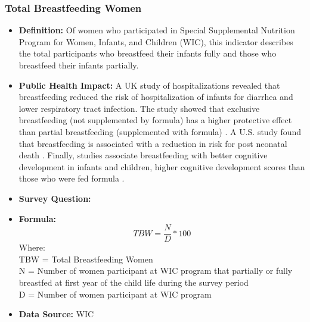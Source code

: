 \documentclass[12pt,letterpaper]{report}
\begin{document}
\subsubsection{Total Breastfeeding Women}
\begin{itemize}
		\item \textbf{Definition:} Of women who participated in Special Supplemental Nutrition Program for Women, Infants, and Children (WIC), this indicator describes the total participants who breastfeed their infants fully and those who breastfeed their infants partially. 
		\item \textbf{Public Health Impact:} A UK study of hospitalizations revealed that breastfeeding reduced the risk of hospitalization of infants for diarrhea and lower respiratory tract infection. The study showed that exclusive breastfeeding (not supplemented by formula) has a higher protective effect than partial breastfeeding (supplemented with formula) \cite{quigley2007breastfeeding}. A U.S. study found that breastfeeding is associated with a reduction in risk for post neonatal death \cite{chen2004breastfeeding}. Finally, studies associate breastfeeding with better cognitive development in infants and children, higher cognitive development scores than those who were fed formula \cite{anderson1999breast}. 
		\item \textbf{Survey Question:}
		\item \textbf{Formula:} 
			\begin{equation}
				TBW = \frac{N}{D} *100
			\end{equation}
Where: \\
			TBW = Total Breastfeeding Women \\
			
			N = Number of women participant at WIC program that partially or fully breastfed at first year of the child life during the survey period \\
			
			D = Number of women participant at WIC program \\
			
			
		\item \textbf{Data Source:} WIC
	\end{itemize}
\end{document}
